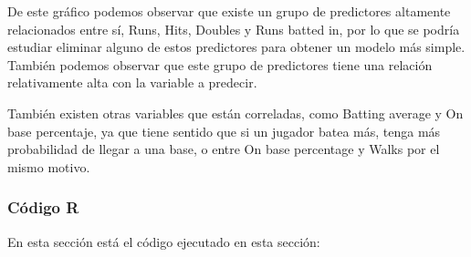 De este gráfico podemos observar que existe un grupo de predictores altamente relacionados entre sí, Runs, Hits, Doubles y Runs batted in, por lo que se podría estudiar eliminar alguno de estos predictores para obtener un modelo más simple. También podemos observar que este grupo de predictores tiene una relación relativamente alta con la variable a predecir.

También existen otras variables que están correladas, como Batting average y On base percentaje, ya que tiene sentido que si un jugador batea más, tenga más probabilidad de llegar a una base, o entre On base percentage y Walks por el mismo motivo.


\subsubsection{Código R}

En esta sección está el código ejecutado en esta sección:

